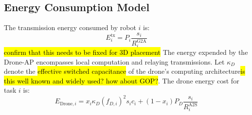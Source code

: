 \subsection{Energy Consumption Model}
The transmission energy consumed by robot $i$ is:
\begin{equation}
E^{\text{tx}}_i = P_i \frac{s_i}{R^{\text{G2A}}_i}
\end{equation}\hl{confirm that this needs to be fixed for 3D placement}
The energy expended by the Drone-AP encompasses local computation and relaying transmissions. Let $\kappa_D$ denote the \hl{effective switched capacitance} of the drone's computing architecture\hl{is this well known and widely used? how about GOP?}. The drone energy cost for task $i$ is:
\begin{equation}
E_{\text{Drone}, i} = x_i \kappa_D (f_{D,i})^2 s_i c_i + (1 - x_i) P_D \frac{s_i}{R^{\text{A2S}}_i}
\end{equation}
